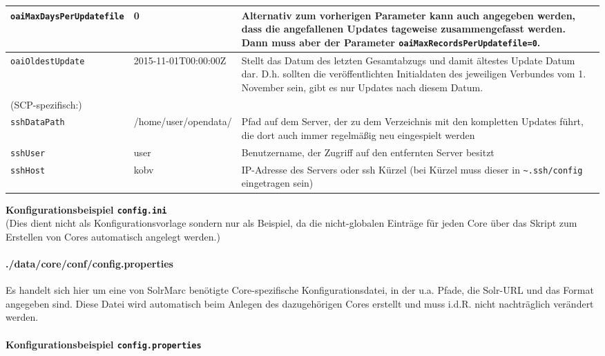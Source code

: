 \documentclass[10pt]{article}
\begin{document}
\begin{center}
\begin{longtable}{| l | p{5cm} | p{5cm} | }
	\texttt{oaiMaxDaysPerUpdatefile} & 0 & Alternativ zum vorherigen Parameter kann auch angegeben werden, dass die angefallenen Updates tageweise zusammengefasst werden. Dann muss aber der Parameter \texttt{oaiMaxRecordsPerUpdatefile=0}.\\ \hline	
	
	\texttt{oaiOldestUpdate} & 2015-11-01T00:00:00Z & Stellt das Datum des letzten Gesamtabzugs und damit ältestes Update Datum dar. D.h. sollten die veröffentlichten Initialdaten des jeweiligen Verbundes vom 1. November sein, gibt es nur Updates nach diesem Datum. \\ \hline	
	

	\multicolumn{3}{l}{(SCP-spezifisch:)} \\ \hline
	
	\texttt{sshDataPath} & /home/user/opendata/ & Pfad auf dem Server, der zu dem Verzeichnis mit den kompletten Updates führt, die dort auch immer regelmäßig neu eingespielt werden \\ \hline
	
	\texttt{sshUser} & user & Benutzername, der Zugriff auf den entfernten Server besitzt \\ \hline
		
	\texttt{sshHost} & kobv & IP-Adresse des Servers oder ssh Kürzel (bei Kürzel muss dieser in \texttt{\textasciitilde.ssh/config} eingetragen sein) \\ \hline
	
	
\end{longtable}
\end{center}

\lstset{
	numbers=left, 
	numberstyle=\small, 
	numbersep=8pt, 
	frame = single, 
	language=Pascal, 
	framexleftmargin=15pt,
	breaklines=true
}
\newpage
\textbf{Konfigurationsbeispiel \texttt{config.ini}} \\
(Dies dient nicht als Konfigurationsvorlage sondern nur als Beispiel, da die nicht-globalen Einträge für jeden Core über das Skript zum Erstellen von Cores automatisch angelegt werden.)


\newpage
\paragraph{./data/core/conf/config.properties}
Es handelt sich hier um eine von SolrMarc benötigte Core-spezifische Konfigurationsdatei, in der u.a. Pfade, die Solr-URL und das Format angegeben sind. Diese Datei wird automatisch beim Anlegen des dazugehörigen Cores erstellt und muss i.d.R. nicht nachträglich verändert werden. \\ \\
\textbf{Konfigurationsbeispiel \texttt{config.properties}} 

\end{document}

